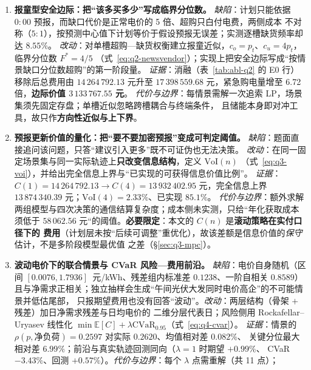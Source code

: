 \begin{enumerate}[label=\textbf{创新 \arabic*.},leftmargin=4.2em]
  \item \textbf{报童型安全边际：把“该多买多少”写成临界分位数。}
    \emph{缺陷}：计划只能依据 \(0{:}00\) 预报，而缺口代价是正常电价的 5 倍、超购只白付电费，两侧成本
    不对称（\(5:1\)），按预测中心值下计划等价于假设预报无误差；实测逐槽缺货频率却达 \(8.55\%\)。
    \emph{改动}：对单槽超购—缺货权衡建立报童近似，\(c_o=p_t\)、\(c_u=4p_t\)，临界分位数 \(F^*=4/5\)
    （式~\eqref{eq:q2-newsvendor}）；实现上把安全边际写成“按情景缺口分位数超购”的第一阶段量。
    \emph{证据}：消融（表~\ref{tab:abl-q2} 的 E0 行）移除后总费用由 \(14\,264\,792.13\) 元升至
    \(17\,398\,559.68\) 元，紧急购电量增至 6.72 倍，\textbf{边际价值 \(3\,133\,767.55\) 元}。
    \emph{代价与边界}：每情景需解一次追索 LP，场景集须先固定存盘；单槽近似忽略跨槽耦合与终端条件，
    且储能本身即对冲工具，故只作\textbf{方向性近似与上下界}。
  \item \textbf{预报更新价值的量化：把“要不要加密预报”变成可判定阈值。}
    \emph{缺陷}：题面直接追问该问题，只答“建议引入更多”既不可证伪也无法决策。
    \emph{改动}：在同一固定场景集与同一实际轨迹上\textbf{只改变信息结构}，定义 \(\mathrm{VoI}(n)\)
    （式~\eqref{eq:q3-voi}），并给出完全信息上界与“已实现的可获得信息价值比例”。
    \emph{证据}：\(C(1)=14\,264\,792.13\to C(4)=13\,932\,402.95\) 元，完全信息上界
    \(13\,874\,340.39\) 元；\(\mathrm{VoI}(4)=2.33\%\)、已实现 \(85.1\%\)。
    \emph{代价与边界}：额外求解两组模型与四次决策的通信结算复杂度；成本侧未实测，只给“年化获取成本
    须低于 \(58\,062.56\) 元“的阈值。\textbf{必要限定}：本文的 \(C(n)\) 是\textbf{滚动策略在实付口径下的
    费用}（计划层未按“后续可调整”重优化），故该差额是信息价值的\emph{保守}估计，不是多阶段模型最优值
    之差（\S\ref{sec:q3-mpc}）。
  \item \textbf{波动电价下的联合情景与 CVaR 风险—费用前沿。}
    \emph{缺陷}：电价自身随机（区间 \([0.0076,1.7936]\)~元/\allowbreak kWh、残差组内标准差
    \(0.1238\)、一阶自相关
    \(0.8589\)）且与净需求正相关；独立抽样会生成“午间光伏大发同时电价高企”的不可能情景并低估尾部，
    只报期望费用也没有回答“波动”。\emph{改动}：两层结构（骨架 \(+\) 残差）加日净需求残差与日均电价的
    二维分层代表日；风险侧用 Rockafellar--Uryasev 线性化
    \(\min\mathbb{E}[C]+\lambda\mathrm{CVaR}_{0.95}\)（式~\eqref{eq:q4-cvar}）。
    \emph{证据}：情景的 \(\rho(p,\text{净负荷})=0.2597\) 对实际 \(0.2620\)、均值相对差 \(0.082\%\)、
    关键分位最大相对差 \(6.99\%\)；前沿与真实轨迹回测同向（\(\lambda=1\) 时期望 \(+0.99\%\)、
    CVaR \(-3.43\%\)、回测 \(+0.57\%\)）。\emph{代价与边界}：每个 \(\lambda\) 点需重解（共 11 点）；

\end{enumerate}
